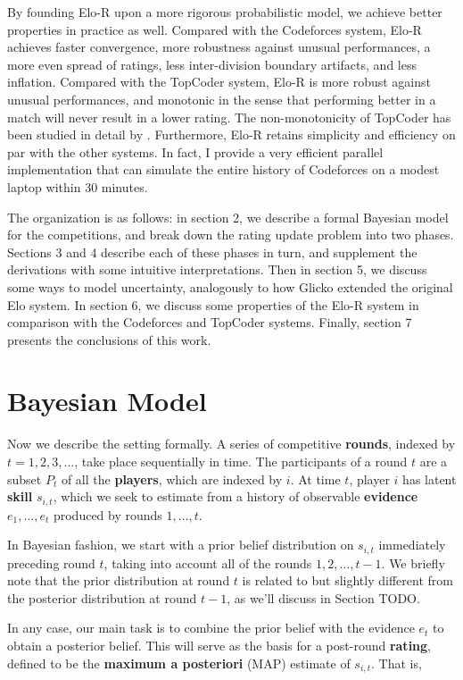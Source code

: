 \documentclass{article}
\begin{document}
By founding Elo-R upon a more rigorous probabilistic model, we achieve better properties in practice as well. Compared with the Codeforces system, Elo-R achieves faster convergence, more robustness against unusual performances, a more even spread of ratings, less inter-division boundary artifacts, and less inflation. Compared with the TopCoder system, Elo-R is more robust against unusual performances, and monotonic in the sense that performing better in a match will never result in a lower rating. The non-monotonicity of TopCoder has been studied in detail by \cite{forivsektheoretical}. Furthermore, Elo-R retains simplicity and efficiency on par with the other systems. In fact, I provide a very efficient parallel implementation that can simulate the entire history of Codeforces on a modest laptop within 30 minutes.

The organization is as follows: in section 2, we describe a formal Bayesian model for the competitions, and break down the rating update problem into two phases. Sections 3 and 4 describe each of these phases in turn, and supplement the derivations with some intuitive interpretations. Then in section 5, we discuss some ways to model uncertainty, analogously to how Glicko extended the original Elo system. In section 6, we discuss some properties of the Elo-R system in comparison with the Codeforces and TopCoder systems. Finally, section 7 presents the conclusions of this work.

\section{Bayesian Model}

Now we describe the setting formally. A series of competitive \textbf{rounds}, indexed by $t=1,2,3,\ldots$, take place sequentially in time. The participants of a round $t$ are a subset $P_t$ of all the \textbf{players}, which are indexed by $i$. At time $t$, player $i$ has latent \textbf{skill} $s_{i,t}$, which we seek to estimate from a history of observable \textbf{evidence} $e_1,\ldots,e_t$ produced by rounds $1,\ldots,t$.

In Bayesian fashion, we start with a prior belief distribution on $s_{i,t}$ immediately preceding round $t$, taking into account all of the rounds $1,2,\ldots,t-1$. We briefly note that the prior distribution at round $t$ is related to but slightly different from the posterior distribution at round $t-1$, as we'll discuss in Section TODO.

In any case, our main task is to combine the prior belief with the evidence $e_t$ to obtain a posterior belief. This will serve as the basis for a post-round \textbf{rating}, defined to be the \textbf{maximum a posteriori} (MAP) estimate of $s_{i,t}$. That is,
\end{document}
